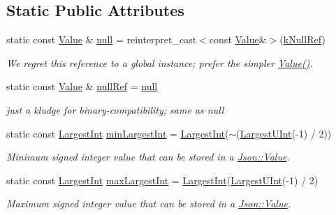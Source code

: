 \subsection*{Static Public Attributes}
\begin{DoxyCompactItemize}
\item 
static const \hyperlink{classJson_1_1Value}{Value} \& \hyperlink{classJson_1_1Value_a6d6e9ea6807e46d5b7ded66d3032f607}{null} = reinterpret\+\_\+cast$<$const \hyperlink{classJson_1_1Value}{Value}\&$>$(\hyperlink{namespaceJson_ab30055b4bbd82aecaca57ccecd63bbe6}{k\+Null\+Ref})
\begin{DoxyCompactList}\small\item\em We regret this reference to a global instance; prefer the simpler \hyperlink{classJson_1_1Value_ada6ba1369448fb0240bccc36efaa46f7}{Value()}. \end{DoxyCompactList}\item 
static const \hyperlink{classJson_1_1Value}{Value} \& \hyperlink{classJson_1_1Value_aaa4ffd4e53967170c3e8c9abf682b5cd}{null\+Ref} = \hyperlink{classJson_1_1Value_a6d6e9ea6807e46d5b7ded66d3032f607}{null}
\begin{DoxyCompactList}\small\item\em just a kludge for binary-\/compatibility; same as null \end{DoxyCompactList}\item 
static const \hyperlink{classJson_1_1Value_a1cbb82642ed05109b9833e49f042ece7}{Largest\+Int} \hyperlink{classJson_1_1Value_af91df130daa50dd43d2cd89e6ee67706}{min\+Largest\+Int} = \hyperlink{classJson_1_1Value_a1cbb82642ed05109b9833e49f042ece7}{Largest\+Int}($\sim$(\hyperlink{classJson_1_1Value_a6682a3684d635e03fc06ba229fa24eec}{Largest\+U\+Int}(-\/1) / 2))
\begin{DoxyCompactList}\small\item\em Minimum signed integer value that can be stored in a \hyperlink{classJson_1_1Value}{Json\+::\+Value}. \end{DoxyCompactList}\item 
static const \hyperlink{classJson_1_1Value_a1cbb82642ed05109b9833e49f042ece7}{Largest\+Int} \hyperlink{classJson_1_1Value_a8b4977696f13296fa8755c7953fafb2f}{max\+Largest\+Int} = \hyperlink{classJson_1_1Value_a1cbb82642ed05109b9833e49f042ece7}{Largest\+Int}(\hyperlink{classJson_1_1Value_a6682a3684d635e03fc06ba229fa24eec}{Largest\+U\+Int}(-\/1) / 2)
\begin{DoxyCompactList}\small\item\em Maximum signed integer value that can be stored in a \hyperlink{classJson_1_1Value}{Json\+::\+Value}. \end{DoxyCompactList}\item 

\end{DoxyCompactItemize}
